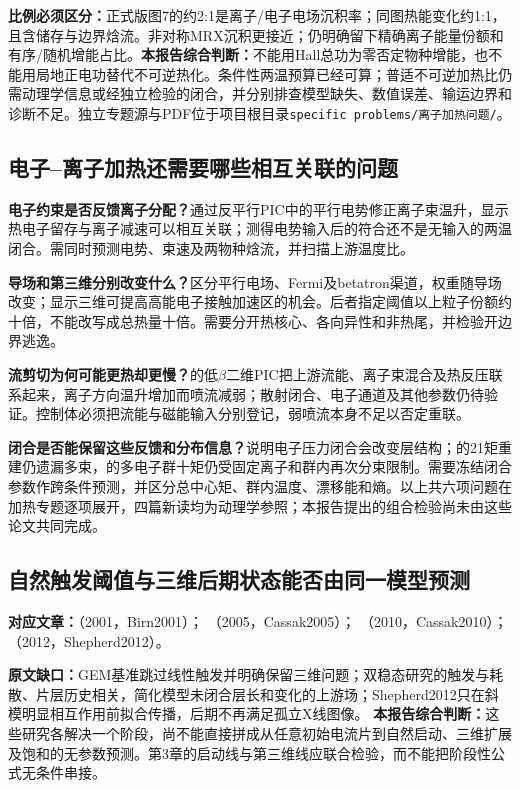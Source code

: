 \textbf{比例必须区分：}\citet{F674}正式版图7的约2:1是离子/电子电场沉积率；同图热能变化约1:1，且含储存与边界焓流。\citet{Yoo2017Heating}非对称MRX沉积更接近；\citet{Yoon2023PhaseSpace}仍明确留下精确离子能量份额和有序/随机增能占比。\textbf{本报告综合判断：}不能用Hall总功为零否定物种增能，也不能用局地正电功替代不可逆热化。条件性两温预算已经可算；普适不可逆加热比仍需动理学信息或经独立检验的闭合，并分别排查模型缺失、数值误差、输运边界和诊断不足。独立专题源与PDF位于项目根目录\texttt{specific problems/离子加热问题/}。

\subsection{电子--离子加热还需要哪些相互关联的问题}
\textbf{电子约束是否反馈离子分配？}\citet{Haggerty2015Partition}通过反平行PIC中的平行电势修正离子束温升，显示热电子留存与离子减速可以相互关联；测得电势输入后的符合还不是无输入的两温闭合。需同时预测电势、束速及两物种焓流，并扫描上游温度比。

\textbf{导场和第三维分别改变什么？}\citet{Dahlin2014Mechanisms}区分平行电场、Fermi及betatron渠道，权重随导场改变；\citet{Dahlin2015ThreeD}显示三维可提高高能电子接触加速区的机会。后者指定阈值以上粒子份额约十倍，不能改写成总热量十倍。需要分开热核心、各向异性和非热尾，并检验开边界逃逸。

\textbf{流剪切为何可能更热却更慢？}\citet{F627}的低$\beta$二维PIC把上游流能、离子束混合及热反压联系起来，离子方向温升增加而喷流减弱；散射闭合、电子通道及其他参数仍待验证。控制体必须把流能与磁能输入分别登记，弱喷流本身不足以否定重联。

\textbf{闭合是否能保留这些反馈和分布信息？}\citet{F611}说明电子压力闭合会改变层结构；\citet{E553}的21矩重建仍遗漏多束，\citet{F635}的多电子群十矩仍受固定离子和群内再次分束限制。需要冻结闭合参数作跨条件预测，并区分总中心矩、群内温度、漂移能和熵。以上共六项问题在加热专题逐项展开，四篇新读均为动理学参照；本报告提出的组合检验尚未由这些论文共同完成。

\subsection{自然触发阈值与三维后期状态能否由同一模型预测}
\textbf{对应文章：}\citet{Birn2001}（2001，Birn2001）；
\citet{Cassak2005}（2005，Cassak2005）；
\citet{Cassak2010}（2010，Cassak2010）；
\citet{Shepherd2012}（2012，Shepherd2012）。

\textbf{原文缺口：}GEM基准跳过线性触发并明确保留三维问题；双稳态研究的触发与耗散、片层历史相关，简化模型未闭合层长和变化的上游场；Shepherd2012只在斜模明显相互作用前拟合传播，后期不再满足孤立X线图像。
\textbf{本报告综合判断：}这些研究各解决一个阶段，尚不能直接拼成从任意初始电流片到自然启动、三维扩展及饱和的无参数预测。第3章的启动线与第三维线应联合检验，而不能把阶段性公式无条件串接。
